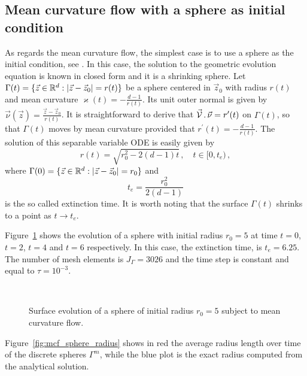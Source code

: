\subsection{Mean curvature flow with a sphere as initial condition}
\label{subsec:mc_sphere}
As regards the mean curvature flow, the simplest case is to use a sphere as the
initial condition, see \cite{Ilmanen98}. In this case, the solution to the
geometric evolution equation is known in closed form and it is a shrinking
sphere. Let $\Gamma(t) = \{ \vec z \in \mathbb R^d : |\vec z -\vec z_0| = r(t) \}$ be
a sphere centered in $\vec z_0$ with radius $r(t)$ and mean curvature
$\varkappa(t) = -\frac{d-1}{r(t)}$. Its unit outer normal is given by
$\vec \nu(\vec z) = \frac{\vec z - \vec z_0}{r(t)}$. It is straightforward to
derive that $\vec{\mathcal{V}}\,.\,\vec\nu = r^{\prime}(t)$ on $\Gamma(t)$, so that
$\Gamma(t)$ moves by mean curvature provided that $r^{\prime}(t) = - \frac{d -
1}{r(t)}$. The solution of this separable variable ODE is easily given by
\begin{equation}
r(t) = \sqrt{r_0^2 - 2(d - 1)t}\,, \quad t\in [0,t_e)\,,
\end{equation}
where $\Gamma(0) = \{ \vec z \in \mathbb R^d : |\vec z -\vec z_0| = r_0 \}$ and
\begin{equation}
t_e=\frac{r_0^2}{2(d - 1)}
\end{equation}
is the so called extinction time. It is worth noting that the surface
$\Gamma(t)$ shrinks to a point as $t \to t_e$.

Figure~\ref{fig:mcf_sphere} shows the evolution of a sphere with initial radius
$r_0=5$ at time $t=0$, $t=2$, $t=4$ and $t=6$ respectively. In this case, the
extinction time, is $t_e=6.25$. The number of mesh elements is $J_\Gamma=3026$
and the time step is constant and equal to $\tau=10^{-3}$.

\begin{figure}[htbp]
\centering
{}
\\
\caption[Mean curvature flow shrinking sphere]{Surface evolution of a sphere of
initial radius $r_0=5$ subject to mean curvature flow.}
\label{fig:mcf_sphere}
\end{figure}

Figure~\ref{fig:mcf_sphere_radius} shows in red the average radius length
over time of the discrete spheres $\Gamma^m$, while the blue plot is the exact
radius computed from the analytical solution.

